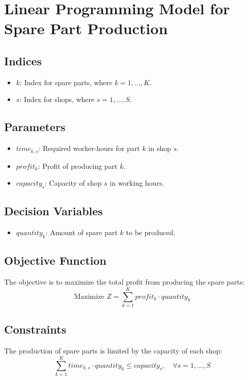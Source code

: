 \documentclass{article}
\begin{document}
\section*{Linear Programming Model for Spare Part Production}

\subsection*{Indices}
\begin{itemize}
    \item $k$: Index for spare parts, where $k = 1, \ldots, K$.
    \item $s$: Index for shops, where $s = 1, \ldots, S$.
\end{itemize}

\subsection*{Parameters}
\begin{itemize}
    \item $time_{k,s}$: Required worker-hours for part $k$ in shop $s$.
    \item $profit_{k}$: Profit of producing part $k$.
    \item $capacity_{s}$: Capacity of shop $s$ in working hours.
\end{itemize}

\subsection*{Decision Variables}
\begin{itemize}
    \item $quantity_{k}$: Amount of spare part $k$ to be produced.
\end{itemize}

\subsection*{Objective Function}
The objective is to maximize the total profit from producing the spare parts:
\[
\text{Maximize } Z = \sum_{k=1}^{K} profit_{k} \cdot quantity_{k}
\]

\subsection*{Constraints}
The production of spare parts is limited by the capacity of each shop:
\[
\sum_{k=1}^{K} time_{k,s} \cdot quantity_{k} \leq capacity_{s}, \quad \forall s = 1, \ldots, S
\]
\end{document}
